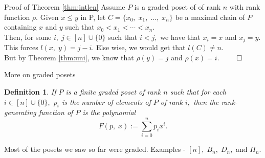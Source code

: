 \documentclass[handout, aspectratio=169]{beamer}
\newtheorem{defn}{Definition}
\begin{document}
\begin{frame}{Proof of Theorem \ref{thm:intlen}}
	Assume $P$ is a graded poset of of rank $n$ with rank function $\rho.$ Given $x \le y$ in P, let $C = \{x_0,\;x_1,\;\ldots,\;x_n\}$ be a maximal chain of $P$ containing $x$ and $y$ such that $x_0 < x_1 < \cdots < x_n.$\\
	Then, for some $i,\;j\in [n]\cup\{0\}$ such that $i < j,$ we have that $x_i = x$ and $x_j = y.$ This forces $l(x,\;y) = j - i.$ Else wise, we would get that $l(C) \neq n.$\\
	But by Theorem \ref{thm:uni}, we know that $\rho(y) = j$ and $\rho(x) = i.$ \hfill $\qed$
\end{frame}
\begin{frame}{More on graded posets}
	\begin{defn}
		If $P$ is a finite graded poset of rank $n$ such that for each $i \in [n] \cup\{0\},$ $p_i$ is the number of elements of $P$ of rank $i,$ then the rank-generating function of $P$ is the polynomial
		\[F(p,\;x) := \sum_{i=0}^{n}p_ix^i.\]
	\end{defn}
	Most of the posets we saw so far were graded. Examples - $[n],\;B_n,\;D_n,$ and $\Pi_n.$

\end{frame}
	
\end{document}

